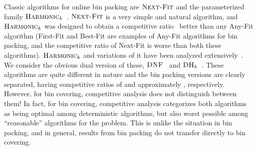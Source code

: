 \documentclass[11pt]{article}
\newcommand{\DNF}{\ensuremath{\operatorname{\textsc{DNF}}}\xspace}
\newcommand{\nextfit}{\ensuremath{\operatorname{\textsc{Next-Fit}}}\xspace}
\newcommand{\harm}{{\ensuremath{\textsc{Harmonic}_k}}\xspace}
\newcommand{\DHk}{{\ensuremath{\textsc{DH}_k}}\xspace}
\begin{document}
Classic algorithms for online bin packing are \nextfit and the
parameterized family \harm~\cite{HL85}.
\nextfit is a very simple and natural algorithm, and \harm was designed to
obtain a competitive ratio~\cite{ST85,KMRS88} better than any Any-Fit
algorithm (First-Fit and Best-Fit are examples of Any-Fit
algorithms for bin packing, and the competitive ratio of Next-Fit is
worse than both these algorithms).
\harm and variations of it have been analyzed extensively~\cite{RBLL89,W93,S02}.
We consider the obvious dual version of these,
\DNF~\cite{AJKL84j} and \DHk~\cite{CW98}.
These algorithms are quite different in nature
and the bin packing versions are clearly separated, 
having competitive ratios of  and approximately , respectively.
However, for bin covering,
competitive analysis does not distinguish between them!
In fact, for bin covering, competitive analysis categorizes both
algorithms as being optimal among deterministic algorithms, but also worst
possible among ``reasonable'' algorithms for the problem.
This is unlike the situation in bin packing, and in general, results
from bin packing do not transfer directly to bin covering.
\end{document}
